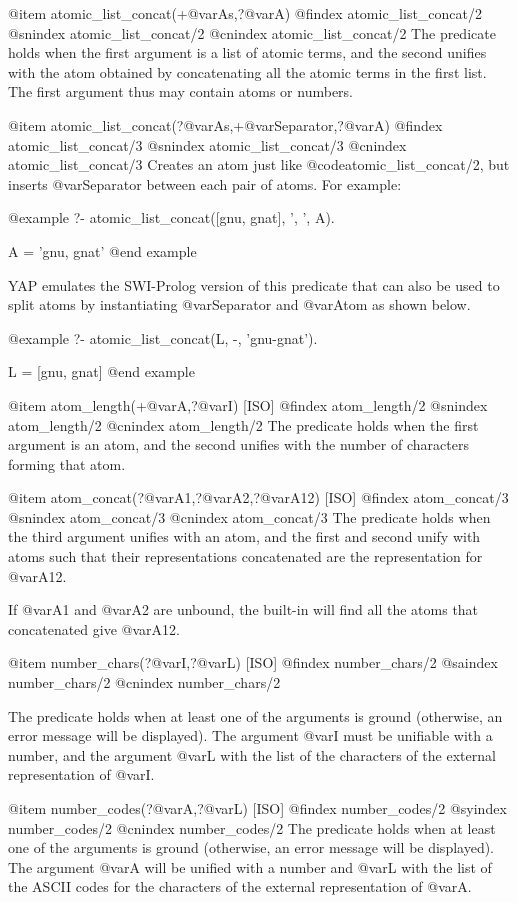 {{{{@item atomic_list_concat(+@var{As},?@var{A})
@findex atomic_list_concat/2
@snindex atomic_list_concat/2
@cnindex atomic_list_concat/2
The predicate holds when the first argument is a list of atomic terms, and
the second unifies with the atom obtained by concatenating all the
atomic terms in the first list. The first argument thus may contain
atoms or numbers.

@item atomic_list_concat(?@var{As},+@var{Separator},?@var{A})
@findex atomic_list_concat/3
@snindex atomic_list_concat/3
@cnindex atomic_list_concat/3
Creates an atom just like @code{atomic_list_concat/2}, but inserts
@var{Separator} between each pair of atoms. For example:

@example
?- atomic_list_concat([gnu, gnat], ', ', A).

A = 'gnu, gnat'
@end example

YAP emulates the SWI-Prolog version of this predicate that can also be
used to split atoms by instantiating @var{Separator} and @var{Atom} as
shown below.

@example
?- atomic_list_concat(L, -, 'gnu-gnat').

L = [gnu, gnat]
@end example

@item atom_length(+@var{A},?@var{I}) [ISO]
@findex atom_length/2
@snindex atom_length/2
@cnindex atom_length/2
The predicate holds when the first argument is an atom, and the second
unifies with the number of characters forming that atom.

@item atom_concat(?@var{A1},?@var{A2},?@var{A12}) [ISO]
@findex atom_concat/3
@snindex atom_concat/3
@cnindex atom_concat/3
The predicate holds when the third argument unifies with an atom, and
the first and second unify with atoms such that their representations
concatenated are the representation for @var{A12}.

If @var{A1} and @var{A2} are unbound, the built-in will find all the atoms
that concatenated give @var{A12}.

@item number_chars(?@var{I},?@var{L}) [ISO]
@findex number_chars/2
@saindex number_chars/2
@cnindex number_chars/2

The predicate holds when at least one of the arguments is ground
(otherwise, an error message will be displayed). The argument @var{I} must
be unifiable with a number, and the argument @var{L} with the list of the
characters of the external representation of @var{I}.

@item number_codes(?@var{A},?@var{L}) [ISO]
@findex number_codes/2
@syindex number_codes/2
@cnindex number_codes/2
The predicate holds when at least one of the arguments is ground
(otherwise, an error message will be displayed). The argument @var{A}
will be unified with a number and @var{L} with the list of the ASCII
codes for the characters of the external representation of @var{A}.

}}}}
